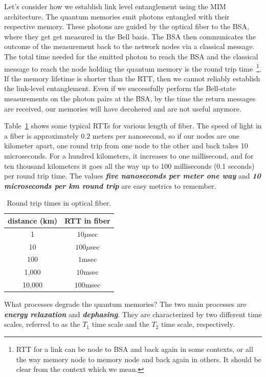 Let's consider how we establish link level entanglement using the MIM architecture.
The quantum memories emit photons entangled with their respective memory.
These photons are guided by the optical fiber to the BSA, where they get get measured in the Bell basis.
The BSA then communicates the outcome of the measurement back to the  network nodes via a classical message.
The total time needed for the emitted photon to reach the BSA and the classical message to reach the node holding the quantum memory is the round trip time~\footnote{RTT for a link can be node to BSA and back again in some contexts, or all the way memory node to memory node and back again in others. It should be clear from the context which we mean.}.
If the memory lifetime is shorter than the RTT, then we cannot reliably establish the link-level entanglement.
Even if we successfully perform the Bell-state measurements on the photon pairs at the BSA, by the time the return messages are received, our memories will have decohered and are not useful anymore.

Table~\ref{tab:rtt} shows some typical RTTs for various length of fiber.
The speed of light in a fiber is approximately $0.2$ meters per nanosecond, so if our nodes are one kilometer apart, one round trip from one node to the other and back takes 10 microseconds. For a hundred kilometers, it increases to one millisecond, and for ten thousand kilometers it goes all the way up to 100 milliseconds (0.1 seconds) per round trip time.
The values \textbf{\emph{five nanoseconds per meter one way}} and \textbf{\emph{10 microseconds per km round trip}} are easy metrics to remember.

\begin{table}
    \setcellgapes{3pt}
    \renewcommand\theadfont{}
    \makegapedcells
    \centering
    \begin{tabular}{cc}
    \hline
    \textbf{distance (km)}  & \textbf{RTT in fiber} \\
    \hline
    1     & $10\mu$sec \\
    10    & $100\mu$sec \\
    100   & $1$msec \\
    1,000 & $10$msec \\
    10,000 & $100$msec \\
    \hline
    \end{tabular}
    \caption{Round trip times in optical fiber.}
    \label{tab:rtt}
\end{table}

What processes degrade the quantum memories?
The two main processes are \textbf{\emph{energy relaxation}} and \textbf{\emph{dephasing}}.
They are characterized by two different time scales, referred to as the $T_1$ time scale and the $T_2$ time scale, respectively.

